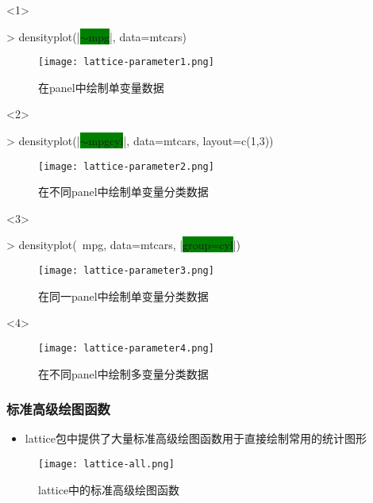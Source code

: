 \begin{frame}[t,fragile]{\subsecname}{\subsubsecname}
\begin{onlyenv}<1>
\begin{rcode}
> densityplot(|\colorbox{green}{$\sim$mpg}|, data=mtcars)
\end{rcode}
\begin{figure}
  \texttt{[image: lattice-parameter1.png]}
  \caption{在panel中绘制单变量数据}
\end{figure}
\end{onlyenv}

\begin{onlyenv}<2>
\begin{rcode}
> densityplot(|\colorbox{green}{$\sim$mpg\textbar cyl}|, data=mtcars, layout=c(1,3))
\end{rcode}
\begin{figure}
  \texttt{[image: lattice-parameter2.png]}
  \caption{在不同panel中绘制单变量分类数据}
\end{figure}
\end{onlyenv}

\begin{onlyenv}<3>
\begin{rcode}
> densityplot(~mpg, data=mtcars, |\colorbox{green}{group=cyl}|)
\end{rcode}
\begin{figure}
  \texttt{[image: lattice-parameter3.png]}
  \caption{在同一panel中绘制单变量分类数据}
\end{figure}
\end{onlyenv}

\begin{onlyenv}<4>
\begin{figure}
  \texttt{[image: lattice-parameter4.png]}
  \caption{在不同panel中绘制多变量分类数据}
\end{figure}
\end{onlyenv}
\end{frame} 

\subsubsection{标准高级绘图函数}
\begin{frame}[t]{\subsecname}{\subsubsecname}
\begin{itemize}
\item lattice包中提供了大量标准高级绘图函数用于直接绘制常用的统计图形
\end{itemize}
\vspace{-5pt}
\begin{figure}\centering
    \texttt{[image: lattice-all.png]}
    \caption{lattice中的标准高级绘图函数}
\end{figure}
\end{frame} 

